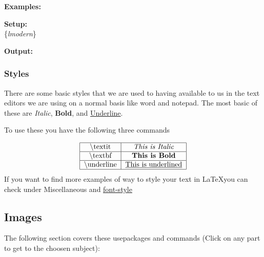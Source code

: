 {\large\textbf{Examples:}}
\begin{multicols}{2}
    \noindent
    \vspace{0.5em}
    \textbf{Setup:} \\
    \{\textit{lmodern}\}
    \vspace{1em}

    \noindent
    \vspace{0.5em}
    \textbf{Output:} \\
    \vspace{1em}

\end{multicols}

\subsubsection{Styles}\label{subsubsec:text_styles}
There are some basic styles that we are used to having available to us in the text editors we are using on a normal basis like word and notepad.
The most basic of these are \textit{Italic}, \textbf{Bold}, and \underline{Underline}. 

To use these you have the following three commands

\begin{align*}
    \begin{tabular}{|c|c|} \hline
       \jbs{textit} & \textit{This is Italic} \\ \hline
       \jbs{textbf} & \textbf{This is Bold} \\ \hline
       \jbs{underline} & \underline{This is underlined} \\ \hline
    \end{tabular}
\end{align*}
If you want to find more examples of way to style your text in \LaTeX you can check under Miscellaneous and \hyperref[secc:font-style-sheet]{font-style}

\subsection{Images}
The following section covers these usepackages and commands (Click on any part to get to the choosen subject): \\

